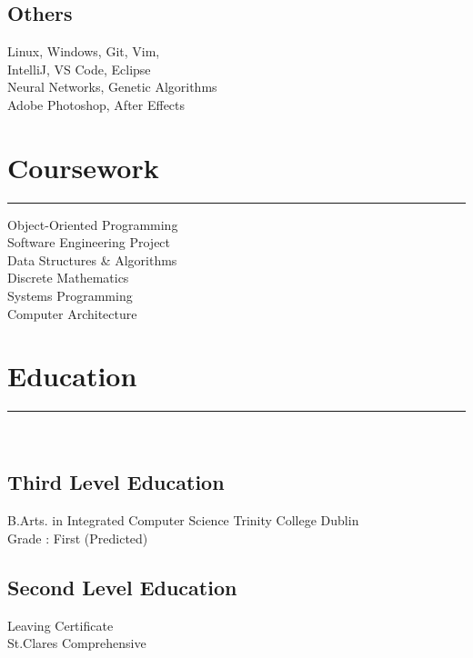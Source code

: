 \documentclass[]{rahulworld-resume}
\begin{document}
\begin{minipage}[t]{0.33\textwidth}
\vspace{6pt}
\subsection{Others}
Linux, Windows, Git, Vim,\\
IntelliJ, VS Code, Eclipse\\
Neural Networks, Genetic Algorithms\\
Adobe Photoshop, After Effects

\sectionsep
\section{Coursework}
\noindent\rule{5cm}{0.4pt}

Object-Oriented Programming\\
Software Engineering Project\\
Data Structures \& Algorithms\\
Discrete Mathematics\\
Systems Programming\\
Computer Architecture\\

\sectionsep
\section{Education} 
\noindent\rule{5cm}{0.4pt}\\
\subsection{Third Level Education}
B.Arts. in Integrated Computer Science
Trinity College Dublin \\
Grade : First (Predicted)\\


\vspace{8pt}
\subsection{Second Level Education}
Leaving Certificate \\
St.Clares Comprehensive\\
\sectionsep
%
%

\end{minipage} 
\end{document}
